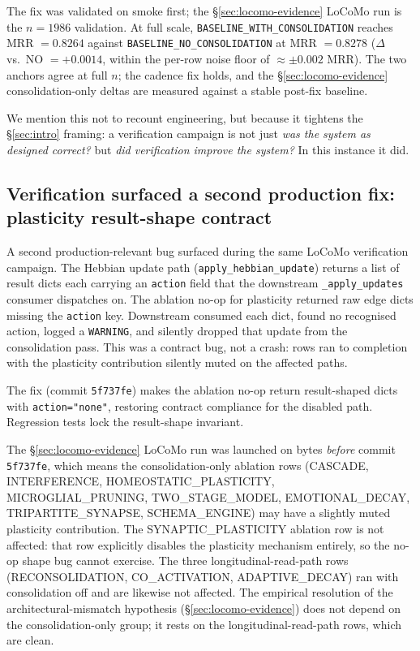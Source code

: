 \documentclass[11pt]{article}
\begin{document}
The fix was validated on smoke first; the \S\ref{sec:locomo-evidence}
LoCoMo run is the $n = 1986$ validation.  At full scale,
\texttt{BASELINE\_WITH\_CONSOLIDATION} reaches MRR $= 0.8264$
against \texttt{BASELINE\_NO\_CONSOLIDATION} at MRR $= 0.8278$
($\Delta$ vs.\ NO $= +0.0014$, within the per-row noise floor of
$\approx \pm 0.002$ MRR).  The two anchors agree at full $n$; the
cadence fix holds, and the \S\ref{sec:locomo-evidence}
consolidation-only deltas are measured against a stable post-fix
baseline.

We mention this not to recount engineering, but because it tightens
the \S\ref{sec:intro} framing: a verification campaign is not just
\emph{was the system as designed correct?} but \emph{did
verification improve the system?}  In this instance it did.

\subsection{Verification surfaced a second production fix: plasticity result-shape contract}
\label{sec:plasticity-fix}

A second production-relevant bug surfaced during the same LoCoMo
verification campaign.  The Hebbian update path
(\texttt{apply\_hebbian\_update}) returns a list of result dicts each
carrying an \texttt{action} field that the downstream
\texttt{\_apply\_updates} consumer dispatches on.  The ablation
no-op for plasticity returned raw edge dicts missing the
\texttt{action} key.  Downstream consumed each dict, found no
recognised action, logged a \texttt{WARNING}, and silently dropped
that update from the consolidation pass.  This was a contract bug,
not a crash: rows ran to completion with the plasticity
contribution silently muted on the affected paths.

The fix (commit \texttt{5f737fe}) makes the ablation no-op return
result-shaped dicts with \texttt{action="none"}, restoring contract
compliance for the disabled path.  Regression tests lock the
result-shape invariant.

The \S\ref{sec:locomo-evidence} LoCoMo run was launched on bytes
\emph{before} commit \texttt{5f737fe}, which means the
consolidation-only ablation rows (CASCADE, INTERFERENCE,
HOMEOSTATIC\_PLASTICITY, MICROGLIAL\_PRUNING, TWO\_STAGE\_MODEL,
EMOTIONAL\_DECAY, TRIPARTITE\_SYNAPSE, SCHEMA\_ENGINE) may have a
slightly muted plasticity contribution.  The SYNAPTIC\_PLASTICITY
ablation row is not affected: that row explicitly disables the
plasticity mechanism entirely, so the no-op shape bug cannot
exercise.  The three longitudinal-read-path rows (RECONSOLIDATION,
CO\_ACTIVATION, ADAPTIVE\_DECAY) ran with consolidation off and are
likewise not affected.  The empirical resolution of the
architectural-mismatch hypothesis (\S\ref{sec:locomo-evidence}) does
not depend on the consolidation-only group; it rests on the
longitudinal-read-path rows, which are clean.
\end{document}
